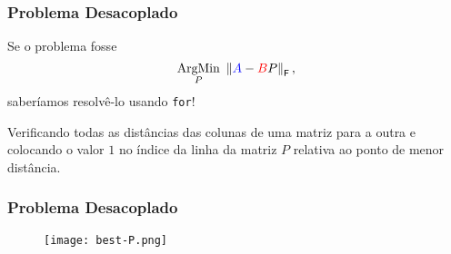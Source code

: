 \begin{frame}[fragile]
  \frametitle{Problema Desacoplado}

  \begin{center}
    Se o problema fosse \[\underset{P}{\text{ArgMin}}\,\, \left\lVert\textcolor{blue}{A} - \textcolor{red}{B}P\right\rVert_\mathsf{F},\] saberíamos resolvê-lo usando \texttt{for}!

    \vspace{1cm}
    Verificando todas as distâncias das colunas de uma matriz para a outra e colocando o valor $1$ no índice da linha da matriz $P$ relativa ao ponto de menor distância.
  \end{center}
\end{frame}

\begin{frame}[fragile]
  \frametitle{Problema Desacoplado}
  \begin{figure}
    \centering
    \texttt{[image: best-P.png]}
  \end{figure}
\end{frame}



